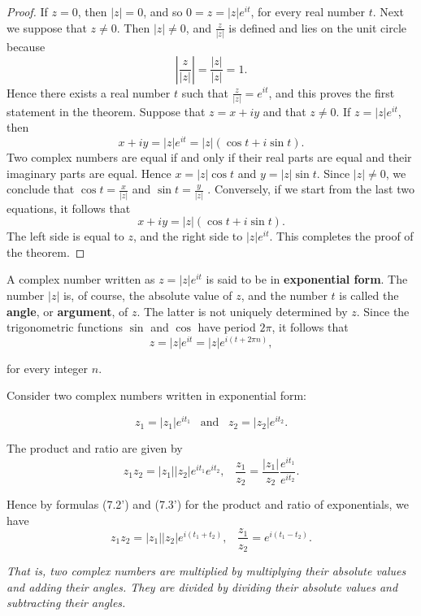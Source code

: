 \begin{proof}
If $z = 0$, then $|z| = 0$, and so $0 = z = |z|e^{it}$, for every real number $t$.
Next we suppose that $z \neq 0$. Then $|z| \neq 0$, and $\frac{z}{|z|}$ is defined and 
lies on the unit circle because
$$
| \frac{z}{ |z|} | = \frac{|z|}{|z|} =1. 
$$
Hence there exists a real number $t$ such that $\frac{z}{|z|} = e^{it}$, and this proves the first statement in the theorem. Suppose that $z = x + iy$ and that $z \neq 0$. 
If $z = |z|e^{it}$, then 
$$
x + iy = |z|e^{it} = |z|(\cos t + i \sin t).
$$
Two complex numbers are equal if and only if their real parts are equal and their imaginary
parts are equal. Hence $x = |z| \cos t$ and $y =|z| \sin t$. Since $|z| \neq 0$, we conclude that $\cos t = \frac{x}{|z|}$ and $\sin t = \frac{y}{|z|}$ . Conversely, if we start from the last two equations, it follows that 
$$
x + iy = |z|(\cos t + i \sin t).
$$
The left side is equal to $z$, and the right side to $|z|e^{it}$. This completes the proof of the theorem.
\end{proof}


A complex number written as $z = |z| e^{it}$ is said to be in \textbf{exponential form}. The number $|z|$ is, of course, the absolute value of $z$, and the number $t$
is called the \textbf{angle}, or \textbf{argument}, of $z$. The latter is not uniquely determined by $z$. Since the trigonometric functions $\sin$ and $\cos$ have period $2\pi$, it follows that
$$
z = |z|e^{it} = |z|e^{i(t +2\pi n)},
$$

\noindent for every integer $n$.

Consider two complex numbers written in exponential form:

$$
z_{1} = |z_1| e^{it_1} \;\;\; \mbox{and} \;\;\; z_{2} = |z_{2}| e^{it_{2}}.
$$

\noindent The product and ratio are given by
$$
z_{1}z_{2} = |z_1| |z_2| e^{it_1} e^{it_2}, \;\;\; \frac{z_1}{z_2} = \frac{|z_1|}{z_2} \frac{e^{it_1}}{e^{it_2}}.
$$

\noindent Hence by formulas (7.2') and (7.3') for the product and ratio of exponentials, we have
$$
z_{1}z_{2} = |z_{1}| |z_{2}| e^{i (t_{1} + t_{2})},\;\;\; \frac{ z_{1}}{z_{2}} =  e^{i (t_{1} - t_{2})}.
$$

\textit{That is, two complex numbers are multiplied by multiplying their absolute values and adding
their angles. They are divided by dividing their absolute values and subtracting their angles.}
\medskip

